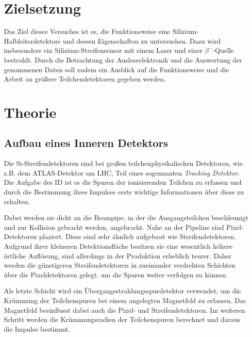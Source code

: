 \section{Zielsetzung}
\label{sec:Zielsetzung}

Das Ziel dieses Versuches ist es, die Funktionsweise eine Silizium-Halbleiterdetektors und dessen Eigenschaften zu untersuchen. Dazu wird insbesondere ein Silizium-Streifensensor mit einem Laser und einer $\beta^{-}$-Quelle bestrahlt. Durch die Betrachtung der Ausleseelektronik und
die Auswertung der genommenen Daten soll zudem ein Ausblick auf die Funktionsweise und die Arbeit an größere Teilchendetektoren
gegeben werden.

\section{Theorie}
\label{sec:Theorie}
\subsection{Aufbau eines Inneren Detektors}

Die Si-Streifendetektoren sind bei großen teilchenphysikalischen Detektoren,
wie z.B. dem ATLAS-Detektor am LHC, Teil eines sogennanten \textit{Tracking Detektor}.
Die Aufgabe des ID ist es die Spuren der ionisierenden Teilchen zu erfassen und
durch die Bestimmung ihres Impulses erste wichtige Informationen über diese zu
erhalten.

Dabei werden sie dicht an die Beampipe, in der die Ausgangsteilchen beschleunigt und
zur Kollision gebracht werden, angebracht. Nahe an der Pipeline sind Pixel-Detektoren plaziert.
Diese sind sehr ähnlich aufgebaut wie Streifendetektoren. Aufgrund ihrer kleineren
Detektionsfläche besitzen sie eine wesentlich höhere örtliche Auflösung, sind
allerdings in der Produktion erheblich teurer. Daher werden die günstigeren
Streifendetektoren in zueinander verdrehten Schichten über die Pixeldetektoren
gelegt, um die Spuren weiter verfolgen zu können.

Als letzte Schicht wird ein Übergangsstrahlungsspurdetektor verwendet, um die
Krümmung der Teilchenspuren bei einem angelegten Magnetfeld zu
erfassen. Das Magnetfeld beeinflusst dabei auch die Pixel- und Streifendetektoren.
Im weiteren Schritt werden die Krümmungsradien der Teilchenspuren
berechnet und daraus die Impulse bestimmt.

